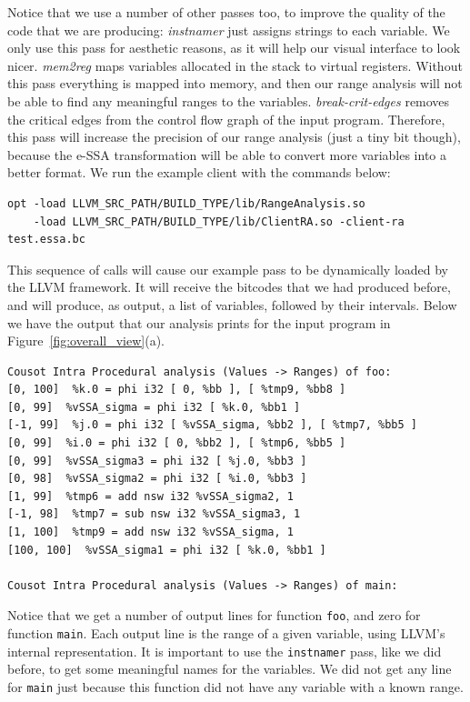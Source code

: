 \documentclass{paper}
\begin{document}
Notice that we use a number of other passes too, to improve the quality of the
code that we are producing:
\textit{instnamer} just assigns strings to each variable.
We only use this pass for aesthetic reasons, as it 
will help our visual interface to look nicer.
\textit{mem2reg} maps variables allocated in the stack to virtual registers.
Without this pass everything is mapped into memory, and then our range analysis
will not be able to find any meaningful ranges to the variables.
\textit{break-crit-edges} removes the critical edges from the control flow graph
of the input program.
Therefore, this pass will increase the precision of our range analysis (just a tiny bit
though), because the e-SSA transformation will be able to convert more variables
into a better format.
We run the example client with the commands below:
\begin{lstlisting}[frame=single]
opt -load LLVM_SRC_PATH/BUILD_TYPE/lib/RangeAnalysis.so 
    -load LLVM_SRC_PATH/BUILD_TYPE/lib/ClientRA.so -client-ra test.essa.bc
\end{lstlisting}

This sequence of calls will cause our example pass to be dynamically loaded
by the LLVM framework.
It will receive the bitcodes that we had produced before, and will produce,
as output, a list of variables, followed by their intervals.
Below we have the output that our analysis prints for the input program in Figure~\ref{fig:overall_view}(a).
\begin{lstlisting}[frame=single]
Cousot Intra Procedural analysis (Values -> Ranges) of foo:
[0, 100]  %k.0 = phi i32 [ 0, %bb ], [ %tmp9, %bb8 ]
[0, 99]  %vSSA_sigma = phi i32 [ %k.0, %bb1 ]
[-1, 99]  %j.0 = phi i32 [ %vSSA_sigma, %bb2 ], [ %tmp7, %bb5 ]
[0, 99]  %i.0 = phi i32 [ 0, %bb2 ], [ %tmp6, %bb5 ]
[0, 99]  %vSSA_sigma3 = phi i32 [ %j.0, %bb3 ]
[0, 98]  %vSSA_sigma2 = phi i32 [ %i.0, %bb3 ]
[1, 99]  %tmp6 = add nsw i32 %vSSA_sigma2, 1
[-1, 98]  %tmp7 = sub nsw i32 %vSSA_sigma3, 1
[1, 100]  %tmp9 = add nsw i32 %vSSA_sigma, 1
[100, 100]  %vSSA_sigma1 = phi i32 [ %k.0, %bb1 ]

Cousot Intra Procedural analysis (Values -> Ranges) of main:
\end{lstlisting}
Notice that we get a number of output lines for function \texttt{foo}, and zero
for function \texttt{main}.
Each output line is the range of a given variable, using LLVM's internal
representation.
It is important to use the \texttt{instnamer} pass, like we did before, to get
some meaningful names for the variables.
We did not get any line for \texttt{main} just because this function did not have
any variable with a known range.




\end{document}
